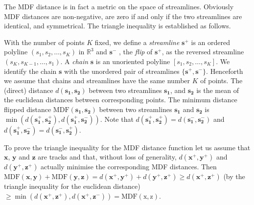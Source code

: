 \documentclass{bioinfo}
\begin{document}
\begin{methods}
The MDF distance is in fact a metric on the space of streamlines.
Obviously MDF distances are non-negative, are zero if and only if the
two streamlines are identical, and symmetrical.  The triangle inequality
is established as follows.

With the number of points $K$ fixed, we define a \textit{streamline}
$\mathbf{s^+}$ is an ordered polyline $(s_1, s_2, \ldots, s_K)$ in
$\mathbb{R}^3$ and $\mathbf{s^-}$ , the \textit{flip} of $\mathbf{s^+}$,
as the reversed streamline $(s_K, s_{K-1}, \ldots, s_1)$.  A
\textit{chain} $\mathbf{s}$ is an unoriented polyline $[s_1,
s_2,\ldots , s_K]$. We identify the chain $\mathbf{s}$ with the
unordered pair of streamlines $\{\mathbf{s^+}, \mathbf{s^-}\}$. Henceforth we
assume that chains and streamlines have the same number $K$ of
points. The (direct) distance $d(\mathbf{s_1},\mathbf{s_2})$ between two
streamlines $\mathbf{s_1}$, and $\mathbf{s_2}$ is the mean of the euclidean
distances between corresponding points. The minimum distance flipped
distance $\mathrm{MDF}(\mathbf{s_1}, \mathbf{s_2})$ between two
streamlines $\mathbf{s_1}$ and $\mathbf{s_2}$ is $\min(d(\mathbf{s_1^+},
\mathbf{s_2^+}), d(\mathbf{s_1^+}, \mathbf{s_2^-}))$. Note that
$d(\mathbf{s_1^+}, \mathbf{s_2^+}) = d(\mathbf{s_1^-}, \mathbf{s_2^-})$
and $d(\mathbf{s_1^+}, \mathbf{s_2^-}) = d(\mathbf{s_1^-},
\mathbf{s_2^+})$.

To prove the triangle inequality for the MDF distance function let us
assume that $\mathbf{x}$, $\mathbf{y}$ and $\mathbf{z}$ are tracks and
that, without loss of generality, $d(\mathbf{x^+}, \mathbf{y^+})$ and
$d(\mathbf{y^+}, \mathbf{z^+})$ actually minimise the corresponding MDF
distances. Then $\mathrm{MDF}(\mathbf{x}, \mathbf{y}) +
\mathrm{MDF}(\mathbf{y}, \mathbf{z}) = d(\mathbf{x^+}, \mathbf{y^+}) +
d(\mathbf{y^+}, \mathbf{z^+}) \ge d(\mathbf{x^+}, \mathbf{z^+})$ (by the
triangle inequality for the euclidean distance) $ \ge
\min(d(\mathbf{x^+}, \mathbf{z^+}), d(\mathbf{x^+}, \mathbf{z^-})) =
\mathrm{MDF}(\mathrm{x}, \mathrm{z})$.


\end{methods}
\end{document}
